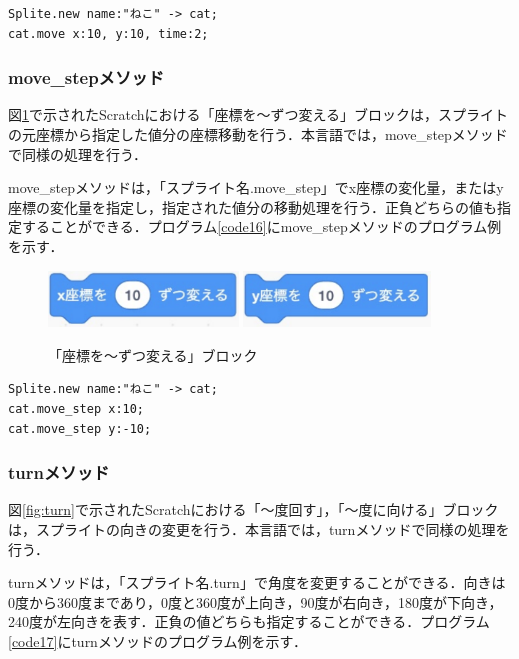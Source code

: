 \documentclass[10pt,a4j]{ltjsarticle}
\begin{document}
\begin{lstlisting}[caption=moveメソッドのプログラム例, label=code15]
Splite.new name:"ねこ" -> cat;
cat.move x:10, y:10, time:2; 
\end{lstlisting}

\subsubsection{move\_stepメソッド}
図\ref{fig:step}で示されたScratchにおける「座標を〜ずつ変える」ブロックは，スプライトの元座標から指定した値分の座標移動を行う．本言語では，move\_stepメソッドで同様の処理を行う．

move\_stepメソッドは，「スプライト名.move\_step」でx座標の変化量，またはy座標の変化量を指定し，指定された値分の移動処理を行う．正負どちらの値も指定することができる．プログラム\ref{code16}にmove\_stepメソッドのプログラム例を示す．

\begin{figure}[H]
  \centering
  \includegraphics[height=15mm]{images/step_x.pdf} 
  \includegraphics[height=15mm]{images/step_y.pdf} 
  \caption{「座標を〜ずつ変える」ブロック}
  \label{fig:step}
\end{figure}

\begin{lstlisting}[caption=move\_stepメソッドのプログラム例, label=code16]
Splite.new name:"ねこ" -> cat;
cat.move_step x:10; 
cat.move_step y:-10; 
\end{lstlisting}

\subsubsection{turnメソッド}
図\ref{fig:turn}で示されたScratchにおける「〜度回す」，「〜度に向ける」ブロックは，スプライトの向きの変更を行う．本言語では，turnメソッドで同様の処理を行う．

turnメソッドは，「スプライト名.turn」で角度を変更することができる．向きは0度から360度まであり，0度と360度が上向き，90度が右向き，180度が下向き，240度が左向きを表す．正負の値どちらも指定することができる．プログラム\ref{code17}にturnメソッドのプログラム例を示す．
\end{document}
